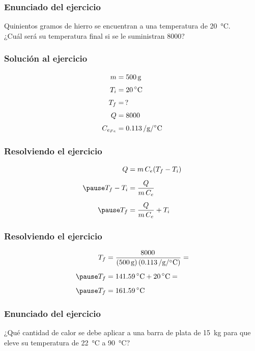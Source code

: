 \documentclass[14pt]{beamer}
\begin{document}
\begin{frame}
\frametitle{Enunciado del ejercicio}
Quinientos gramos de hierro se encuentran a una temperatura de \SI{20}{\degreeCelsius}.
\\
\bigskip
\pause
¿Cuál será su temperatura final si se le suministran \SI{8000}{\cal}?
\end{frame}
\begin{frame}
\frametitle{Solución al ejercicio}
\pause
\begin{align*}
m &= \SI{500}{\gram} \\[0.3em]
T_{i} &= \SI{20}{\degreeCelsius} \\[0.3em]
T_{f} &= \, ? \\[0.3em]
Q &= \SI{8000}{\cal} \\[0.3em]
C_{e_{Fe}} &= \SI{0.113}{\cal\per\gram\per\degreeCelsius}
\end{align*}
\end{frame}
\begin{frame}
\frametitle{Resolviendo el ejercicio}
\pause
\begin{eqnarray*}
\begin{aligned}
Q &= m \, C_{e} (T_{f} - T_{i}) \\[0.5em] \pause
T_{f} - T_{i} &= \dfrac{Q}{m \, C_{e}} \\[0.5em] \pause
T_{f} &= \dfrac{Q}{m \, C_{e}} + T_{i}
\end{aligned}
\end{eqnarray*}
\end{frame}
\begin{frame}
\frametitle{Resolviendo el ejercicio}
\pause
\begin{eqnarray*}
\begin{aligned}
T_{f} &= \dfrac{\SI{8000}{\cal}}{(\SI{500}{\gram})\left( \SI{0.113}{\cal\per\gram\per\degreeCelsius} \right)} = \\[0.5em] \pause
T_{f} &= \SI{141.59}{\degreeCelsius} + \SI{20}{\degreeCelsius} = \\[0.5em] \pause
T_{f} &= \SI{161.59}{\degreeCelsius}
\end{aligned}
\end{eqnarray*}
\end{frame}
\begin{frame}
\frametitle{Enunciado del ejercicio}
¿Qué cantidad de calor se debe aplicar a una barra de plata de \SI{15}{\kilo\gram} para que eleve su temperatura de \SI{22}{\degreeCelsius} a \SI{90}{\degreeCelsius}?
\end{frame}
\end{document}
